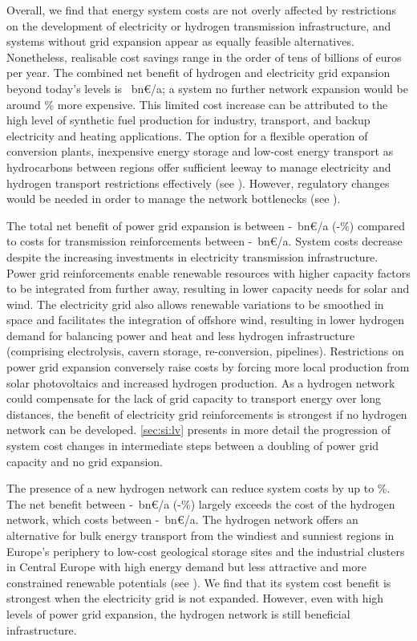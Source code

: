 Overall, we find that energy system costs are not overly affected by
restrictions on the development of electricity or hydrogen transmission
infrastructure, and systems without grid expansion appear as equally feasible
alternatives. Nonetheless, realisable cost savings range in the order of tens of
billions of euros per year. The combined net benefit of hydrogen and electricity
grid expansion beyond today's levels is \gridbenefitabs~bn\euro/a; a system no
further network expansion would be around \gridbenefitrel\% more expensive. This
limited cost increase can be attributed to the high level of synthetic fuel
production for industry, transport, and backup electricity and heating
applications. The option for a flexible operation of conversion plants,
inexpensive energy storage and low-cost energy transport as hydrocarbons between
regions offer sufficient leeway to manage electricity and hydrogen transport
restrictions effectively (see ). However, regulatory changes
would be needed in order to manage the network bottlenecks (see
).

The total net benefit of power grid expansion is between
\minacbenefitabs-\maxacbenefitabs~bn\euro/a
(\minacbenefitrel-\maxacbenefitrel\%) compared to costs for transmission
reinforcements between \minaccost-\maxaccost~bn\euro/a. System costs decrease
despite the increasing investments in electricity transmission infrastructure.
Power grid reinforcements enable renewable resources with higher capacity
factors to be integrated from further away, resulting in lower capacity needs
for solar and wind. The electricity grid also allows renewable variations to be
smoothed in space and facilitates the integration of offshore wind, resulting in
lower hydrogen demand for balancing power and heat and less hydrogen
infrastructure (comprising electrolysis, cavern storage, re-conversion,
pipelines). Restrictions on power grid expansion conversely raise costs by
forcing more local production from solar photovoltaics and increased hydrogen
production. As a hydrogen network could compensate for the lack of grid capacity
to transport energy over long distances, the benefit of electricity grid
reinforcements is strongest if no hydrogen network can be developed.
\cref{sec:si:lv} presents in more detail the progression of system cost changes
in intermediate steps between a doubling of power grid capacity and no grid
expansion.

The presence of a new hydrogen network can reduce system costs by up to
\maxhybenefitrel\%. The net benefit between
\minhybenefitabs-\maxhybenefitabs~bn\euro/a
(\minhybenefitrel-\maxhybenefitrel\%) largely exceeds the cost of the hydrogen
network, which costs between \minhycost-\maxhycost~bn\euro/a. The hydrogen
network offers an alternative for bulk energy transport from the windiest and
sunniest regions in Europe's periphery to low-cost geological storage sites and
the industrial clusters in Central Europe with high energy demand but less
attractive and more constrained renewable potentials (see
). We find that its system cost benefit is strongest
when the electricity grid is not expanded. However, even with high levels of
power grid expansion, the hydrogen network is still beneficial infrastructure.


